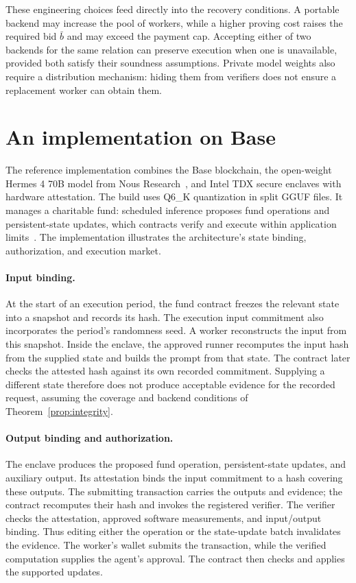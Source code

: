 \documentclass[10pt,letterpaper]{article}
\begin{document}
These engineering choices feed directly into the recovery conditions. A portable backend may increase the pool of workers, while a higher proving cost raises the required bid $\bar b$ and may exceed the payment cap. Accepting either of two backends for the same relation can preserve execution when one is unavailable, provided both satisfy their soundness assumptions. Private model weights also require a distribution mechanism: hiding them from verifiers does not ensure a replacement worker can obtain them.

\section{An implementation on Base}
\label{sec:case}
The reference implementation combines the Base blockchain, the open-weight Hermes 4 70B model from Nous Research~\citep{hermes4}, and Intel TDX secure enclaves with hardware attestation. The build uses Q6\_K quantization in split GGUF files. It manages a charitable fund: scheduled inference proposes fund operations and persistent-state updates, which contracts verify and execute within application limits~\citep{implementation2026,russell2026,essay2026}. The implementation illustrates the architecture's state binding, authorization, and execution market.

\paragraph{Input binding.}
At the start of an execution period, the fund contract freezes the relevant state into a snapshot and records its hash. The execution input commitment also incorporates the period's randomness seed. A worker reconstructs the input from this snapshot. Inside the enclave, the approved runner recomputes the input hash from the supplied state and builds the prompt from that state. The contract later checks the attested hash against its own recorded commitment. Supplying a different state therefore does not produce acceptable evidence for the recorded request, assuming the coverage and backend conditions of Theorem~\ref{prop:integrity}.

\paragraph{Output binding and authorization.}
The enclave produces the proposed fund operation, persistent-state updates, and auxiliary output. Its attestation binds the input commitment to a hash covering these outputs. The submitting transaction carries the outputs and evidence; the contract recomputes their hash and invokes the registered verifier. The verifier checks the attestation, approved software measurements, and input/output binding. Thus editing either the operation or the state-update batch invalidates the evidence. The worker's wallet submits the transaction, while the verified computation supplies the agent's approval. The contract then checks and applies the supported updates.
\end{document}
